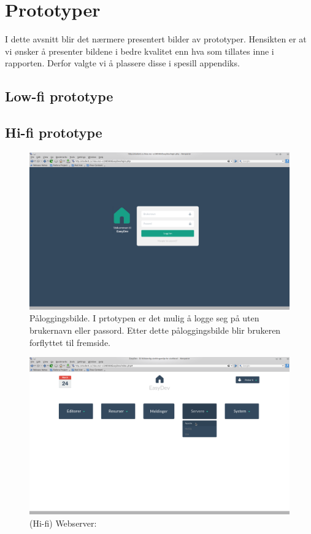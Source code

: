 \chapter{Prototyper}
I dette avsnitt blir det nærmere presentert bilder av prototyper. Hensikten er at vi ønsker å presenter bildene i bedre kvalitet enn hva som tillates inne i rapporten. Derfor valgte vi å plassere disse i spesill appendiks.
\section{Low-fi prototype}

\section{Hi-fi prototype}
\begin{figure}[ht]
\includegraphics[width=\textwidth,height=\textheight,keepaspectratio]{./img/prosessdokumentasjon/hifi/login.png}
\caption[(Hi-fi) Påloggingsbilde]{Påloggingsbilde. I prtotypen er det mulig å logge seg på uten brukernavn eller passord. Etter dette påloggingsbilde blir brukeren forflyttet til fremside.}
\label{fig:loginhi}
\end{figure}

\begin{figure}[ht]
\includegraphics[width=\textwidth,height=\textheight,keepaspectratio]{./img/prosessdokumentasjon/hifi/a1.png}
\caption{(Hi-fi) Webserver: }
\label{fig:apachehi1}
\end{figure}


